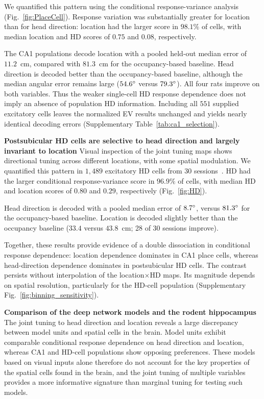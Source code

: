 \documentclass[11pt]{article}
\begin{document}
We quantified this pattern using the conditional response-variance analysis (Fig.~\ref{fig:PlaceCell}). Response variation was substantially greater for location than for head direction: location had the larger score in $98.1\%$ of cells, with median location and HD scores of $0.75$ and $0.08$, respectively.

The CA1 populations decode location with a pooled held-out median error of $11.2$~cm, compared with $81.3$~cm for the occupancy-based baseline. Head direction is decoded better than the occupancy-based baseline, although the median angular error remains large ($54.6\degree$ versus $79.3\degree$). All four rats improve on both variables. Thus the weaker single-cell HD response dependence does not imply an absence of population HD information. Including all $551$ supplied excitatory cells leaves the normalized EV results unchanged and yields nearly identical decoding errors (Supplementary Table~\ref{tab:ca1_selection}).

\textbf{Postsubicular HD cells are selective to head direction and largely invariant to location} Visual inspection of the joint tuning maps shows directional tuning across different locations, with some spatial modulation. We quantified this pattern in $1{,}489$ excitatory HD cells from 30 sessions~\cite{Duszkiewicz2024}. HD had the larger conditional response-variance score in $96.9\%$ of cells, with median HD and location scores of $0.80$ and $0.29$, respectively (Fig.~\ref{fig:HD}).

Head direction is decoded with a pooled median error of $8.7\degree$, versus $81.3\degree$ for the occupancy-based baseline. Location is decoded slightly better than the occupancy baseline ($33.4$ versus $43.8$~cm; 28 of 30 sessions improve).

Together, these results provide evidence of a double dissociation in conditional response dependence: location dependence dominates in CA1 place cells, whereas head-direction dependence dominates in postsubicular HD cells. The contrast persists without interpolation of the location$\times$HD maps. Its magnitude depends on spatial resolution, particularly for the HD-cell population (Supplementary Fig.~\ref{fig:binning_sensitivity}).

{\bf Comparison of the deep network models and the rodent hippocampus} The joint tuning to head direction and location reveals a large discrepancy between model units and spatial cells in the brain. Model units exhibit comparable conditional response dependence on head direction and location, whereas CA1 and HD-cell populations show opposing preferences. These models based on visual inputs alone therefore do not account for the key properties of the spatial cells found in the brain, and the joint tuning of multiple variables provides a more informative signature than marginal tuning for testing such models.
\end{document}
